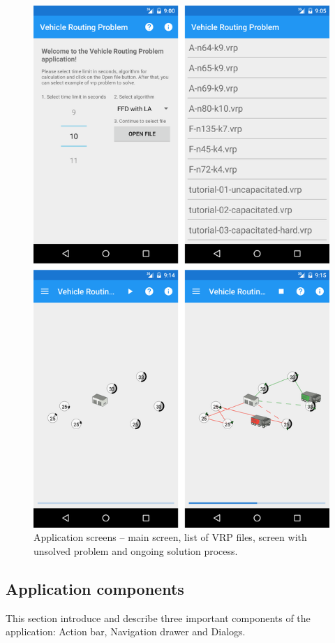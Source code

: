 \begin{figure}[h!]
    \centering
    \includegraphics[scale=0.15]{fig/screens.png}
    \caption{Application screens -- main screen, list of VRP files, screen with unsolved problem and ongoing solution
    process.}
    \label{ApplicationScreensFigure}
\end{figure}

\subsection{Application components}
This section introduce and describe three important components of the application: Action bar, Navigation drawer and
Dialogs.

